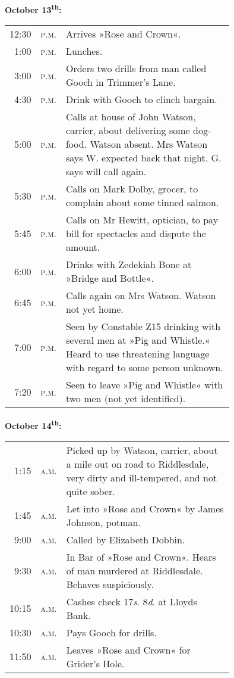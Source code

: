 \begin{samepage}
\textbf{October 13\textsuperscript{th}:}	\\
\begin{tabular} {r l p{0.75\linewidth} } 
12:30&\textsc{p.m.}&Arrives »Rose and Crown«.\\
1:00&\textsc{p.m.}&Lunches.\\
3:00&\textsc{p.m.}&Orders two drills from man called Gooch in Trimmer's Lane.\\
4:30&\textsc{p.m.}&Drink with Gooch to clinch bargain.\\
5:00&\textsc{p.m.}&Calls at house of John Watson, carrier, about delivering some dog-food. Watson absent. Mrs Watson says W. expected back that night. G. says will call again.\\
5:30&\textsc{p.m.}&Calls on Mark Dolby, grocer, to complain about some tinned salmon.\\
5:45&\textsc{p.m.}&Calls on Mr Hewitt, optician, to pay bill for spectacles and dispute the amount.\\
6:00&\textsc{p.m.}&Drinks with Zedekiah Bone at »Bridge and Bottle«.\\
6:45&\textsc{p.m.}&Calls again on Mrs Watson. Watson not yet home.\\
7:00&\textsc{p.m.}&Seen by Constable Z15 drinking with several men at »Pig and Whistle.« Heard to use threatening language with regard to some person unknown.\\
7:20&\textsc{p.m.}&Seen to leave »Pig and Whistle« with two men (not yet identified).\\
\end{tabular}
\end{samepage}

\begin{samepage}

\textbf{October 14\textsuperscript{th}:}	\\
\begin{tabular} {r l p{0.75\linewidth} } 
1:15&\textsc{a.m.}&Picked up by Watson, carrier, about a mile out on road to Riddlesdale, very dirty and ill-tempered, and not quite sober.\\
1:45&\textsc{a.m.}&Let into »Rose and Crown« by James Johnson, potman.\\
9:00&\textsc{a.m.}&Called by Elizabeth Dobbin.\\
9:30&\textsc{a.m.}&In Bar of »Rose and Crown«. Hears of man murdered at Riddlesdale. Behaves suspiciously.\\
10:15&\textsc{a.m.}&Cashes check \textsterling 129 17\textit{s}. 8\textit{d}. at Lloyds Bank.\\
10:30&\textsc{a.m.}&Pays Gooch for drills.\\
11:50&\textsc{a.m.}&Leaves »Rose and Crown« for Grider's Hole.\\
\end{tabular}
\end{samepage}

